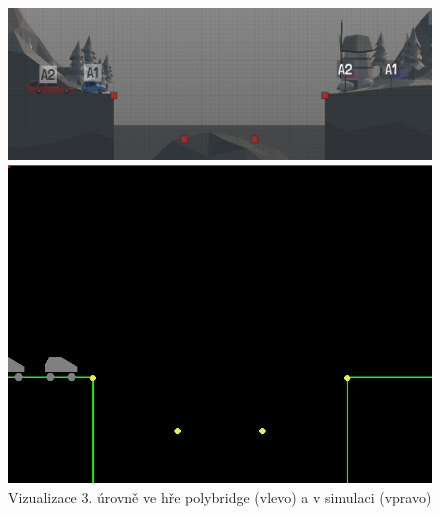 \begin{figure}[ht]
    \centering
    \begin{minipage}{0.49\textwidth}
        \centering
        \includegraphics[width=\linewidth]{img/poly_lvl3.png}
    \end{minipage}\hfill
    \begin{minipage}{0.49\textwidth}
        \centering
        \includegraphics[width=\linewidth]{img/impl_lvl3.png}
    \end{minipage}
    \caption{Vizualizace $3.$ úrovně ve hře polybridge (vlevo) a v simulaci (vpravo)}
    \label{impl-fig:4}
\end{figure}

